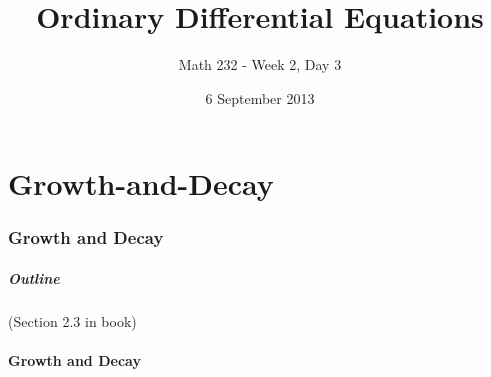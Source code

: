 \part{Growth-and-Decay}
\section{Growth and Decay}

\title{Ordinary Differential Equations}
\subtitle{Math 232 - Week 2, Day 3}
\date{6 September 2013}

\begin{frame}
  \titlepage
\end{frame}

\begin{frame}
  \frametitle{Outline}
  \tableofcontents[hideothersubsections]

  (Section 2.3 in book)
\end{frame}


\subsection{Growth and Decay}



